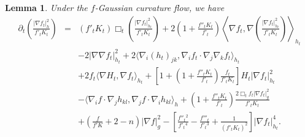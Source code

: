 \documentclass{amsart}
\newtheorem{lemma}[theorem]{Lemma}
\theoremstyle{definition}
\theoremstyle{remark}
\numberwithin{equation}{section}
\begin{document}
\begin{lemma} \label{l3.2}Under the $f$-Gaussian curvature flow, we have
\begin{eqnarray*}
\partial_{t}\left(\frac{|\nabla f_{t}|^{2}_{h}}{f'_{t}K_{t}}\right)&=&
(f'_{t}K_{t})\Box_{t}\left(\frac{|\nabla f_{t}|^{2}_{h_{t}}}{f'_{t}K_{t}}\right)+2\left(1+\frac{f''_{t}K_{t}}{f'_{t}}\right)\left\langle\nabla f_{t},\nabla
\left(\frac{|\nabla f_{t}|^{2}_{h_{t}}}{f'_{t}K_{t}}\right)\right\rangle_{h_{t}}\\
&&-2|\nabla\nabla f_{t}|^{2}_{h_{t}}+2\langle\nabla_{i}(h_{t})_{jk},
\nabla_{i}f_{t}\cdot
\nabla_{j}\nabla_{k}f_{t}\rangle_{h_{t}}\\
&&+2f_{t}\langle\nabla H_{t},\nabla f_{t}\rangle_{h_{t}}+\left[1+\left(1+\frac{f''_{t}K_{t}}{f'_{t}}
\right)\frac{f_{t}}{f'_{t}K_{t}}\right]H_{t}|
\nabla f_{t}|^{2}_{h_{t}}\\
&&-\langle\nabla_{i}f\cdot\nabla_{j}h_{kl},\nabla_{j}f\cdot\nabla_{i}h_{kl}\rangle_{h}
+\left(1+\frac{f''_{t}K_{t}}{f'_{t}}\right)\frac{2\Box_{t} f_{t}|\nabla f_{t}|^{2}_{g}}{f'_{t}K_{t}}\\
&&+\left(\frac{f}{f'K}+2-n\right)|\nabla f|^{2}_{g}-\left[\frac{f''_{t}{}^{2}}{f'_{t}{}^{4}}
-\frac{f'''_{t}}{f'_{t}{}^{3}}+\frac{1}{(f'_{t}K_{t})^{2}}\right]|\nabla f_{t}
|^{4}_{h_{t}}.
\end{eqnarray*}
\end{lemma}
\end{document}
